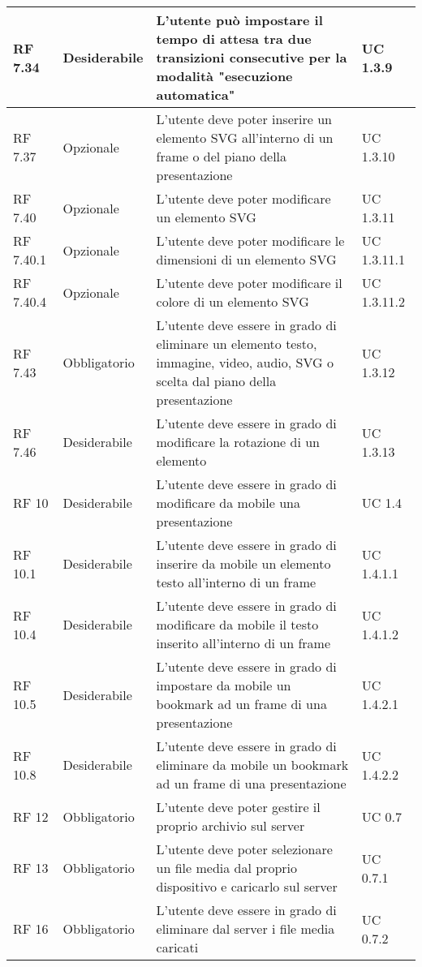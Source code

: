 {\begin{longtable} [c]{| p{2.5cm} | p{2.5cm} | p{6cm} |p{2.5cm}|}
 \hline 
RF 7.34 & Desiderabile & L'utente può impostare il tempo di attesa tra due transizioni consecutive per la modalità "esecuzione automatica" & UC 1.3.9\\ 
 \hline 
RF 7.37 & Opzionale & L'utente deve poter inserire un elemento SVG all'interno di un frame o del piano della presentazione & UC 1.3.10\\ 
 \hline 
RF 7.40 & Opzionale & L'utente deve poter modificare un elemento SVG & UC 1.3.11\\ 
 \hline 
RF 7.40.1 & Opzionale & L'utente deve poter modificare le dimensioni di un elemento SVG & UC 1.3.11.1\\ 
 \hline 
RF 7.40.4 & Opzionale & L'utente deve poter modificare il colore di un elemento SVG & UC 1.3.11.2\\ 
 \hline 
RF 7.43 & Obbligatorio & L'utente deve essere in grado di eliminare un elemento testo, immagine, video, audio, SVG o scelta dal piano della presentazione & UC 1.3.12\\ 
 \hline 
RF 7.46 & Desiderabile & L'utente deve essere in grado di modificare la rotazione di un elemento & UC 1.3.13\\ 
 \hline 
RF 10 & Desiderabile & L’utente deve essere in grado di modificare da mobile una presentazione & UC 1.4\\ 
 \hline 
RF 10.1 & Desiderabile & L'utente deve essere in grado di inserire da mobile un elemento testo all'interno di un frame & UC 1.4.1.1\\ 
 \hline 
RF 10.4 & Desiderabile & L'utente deve essere in grado di modificare da mobile il testo inserito all'interno di un frame & UC 1.4.1.2\\ 
 \hline 
RF 10.5 & Desiderabile & L'utente deve essere in grado di impostare da mobile un bookmark ad un frame di una presentazione & UC 1.4.2.1\\ 
 \hline 
RF 10.8 & Desiderabile & L'utente deve essere in grado di eliminare da mobile un bookmark ad un frame di una presentazione & UC 1.4.2.2\\ 
 \hline 
RF 12 & Obbligatorio & L'utente deve poter gestire il proprio archivio sul server & UC 0.7\\ 
 \hline 
RF 13 & Obbligatorio & L’utente deve poter selezionare un file media dal proprio dispositivo e caricarlo sul server & UC 0.7.1\\ 
 \hline 
RF 16 & Obbligatorio & L’utente deve essere in grado di eliminare dal server i file media caricati & UC 0.7.2\\ 
 \hline 

\end{longtable}}
